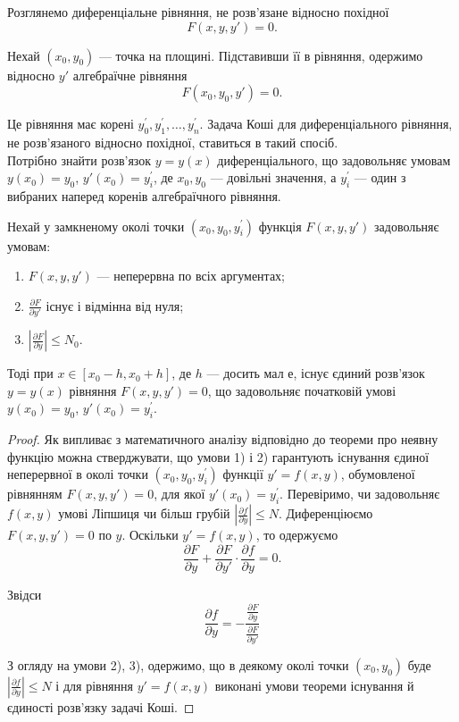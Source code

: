 Розглянемо диференціальне рівняння, не розв'язане відносно похідної
\begin{equation*}
	F(x, y, y') = 0.
\end{equation*}

Нехай $(x_0, y_0)$ --- точка на площині. Підставивши її в рівняння, одержимо відносно $y'$ алгебраїчне рівняння
\begin{equation*}
	F(x_0, y_0, y') = 0.
\end{equation*}

Це рівняння має корені $y_0^\prime, y_1^\prime, \ldots, y_n^\prime$. Задача Коші для диференціального рівняння, не розв'язаного відносно похідної, ставиться в такий спосіб. \\

Потрібно знайти розв'язок $y=y(x)$ диференціального, що задовольняє умовам $y(x_0)=y_0$, $y'(x_0)=y_i^\prime$, де $x_0,y_0$ --- довільні значення, а $y_i^\prime$ --- один з вибраних наперед коренів алгебраїчного рівняння.

\begin{theorem}
	Нехай у замкненому околі точки $(x_0, y_0, y_i^\prime)$ функція $F(x,y,y')$ задовольняє умовам:
	\begin{enumerate}
		\item $F(x,y,y')$ --- неперервна по всіх аргументах;
		\item $\frac{\partial F}{\partial y'}$ існує і відмінна від нуля;
		\item $\left| \frac{\partial F}{\partial y}\right| \le N_0$.
	\end{enumerate}

	Тоді при $x \in [x_0 - h, x_0 + h]$, де $h$ --- досить мал е, існує єдиний розв'язок $y=y(x)$ рівняння $F(x, y, y') =0$, що задовольняє початковій умові $y(x_0)=y_0$, $y'(x_0)=y_i^\prime$.
\end{theorem}

\begin{proof}
	Як випливає з математичного аналізу відповідно до теореми про неявну функцію можна стверджувати, що умови 1) і 2) гарантують існування єдиної неперервної в околі точки $(x_0,y_0,y_i^\prime)$ функції $y'=f(x,y)$, обумовленої рівнянням $F(x,y,y')=0$, для якої $y'(x_0)=y_i^\prime$. Перевіримо, чи задовольняє $f(x,y)$ умові Ліпшиця чи більш грубій $\left|\frac{\partial f}{\partial y}\right| \le N$. Диференціюємо $F(x,y,y')=0$ по $y$. Оскільки $y'=f(x,y)$, то одержуємо
	\begin{equation*}
		\frac{\partial F}{\partial y} + \frac{\partial F}{\partial y'} \cdot \frac{\partial f}{\partial y} = 0.
	\end{equation*}

	Звідси
	\begin{equation*}
		\frac{\partial f}{\partial y} = - \frac{\frac{\partial F}{\partial y}}{\frac{\partial F}{\partial y'}} 
	\end{equation*} 

	З огляду на умови 2), 3), одержимо, що в деякому околі точки $(x_0,y_0)$ буде $\left|\frac{\partial f}{\partial y}\right| \le N$ і для рівняння $y'=f(x,y)$ виконані умови теореми існування й єдиності розв'язку задачі Коші.
\end{proof}
